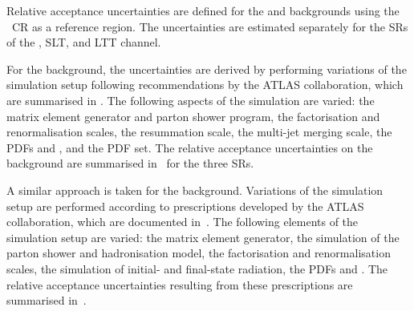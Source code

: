 


Relative acceptance uncertainties are defined for the \ZHF and \ttbar
backgrounds using the \ZHF~CR as a reference region. The uncertainties are
estimated separately for the SRs of the \hadhad, \lephad SLT, and \lephad LTT
channel.

For the \ZHF background, the uncertainties are derived by performing variations
of the simulation setup following recommendations by the ATLAS collaboration,
which are summarised in . The following aspects of
the simulation are varied: the matrix element generator and parton shower
program, the factorisation and renormalisation scales, the resummation scale,
the multi-jet merging scale, the PDFs and \alphas, and the PDF set. The relative
acceptance uncertainties on the \ZHF background are summarised
in~ for the three SRs.

A similar approach is taken for the \ttbar background. Variations of the
simulation setup are performed according to prescriptions developed by the ATLAS
collaboration, which are documented in~. The
following elements of the simulation setup are varied: the matrix element
generator, the simulation of the parton shower and hadronisation model, the
factorisation and renormalisation scales, the simulation of initial- and
final-state radiation, the PDFs and \alphas. The relative acceptance
uncertainties resulting from these prescriptions are summarised
in~.

